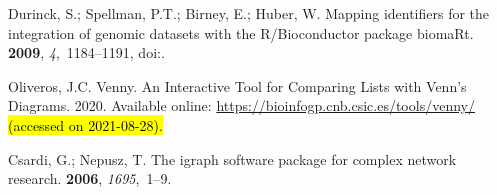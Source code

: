 \documentclass[ijms,article,accept,moreauthors,pdftex]{Definitions/mdpi}
\begin{document}
\begin{thebibliography}{999}
Durinck, S.; Spellman, P.T.; Birney, E.; Huber, W.
\newblock Mapping identifiers for the integration of genomic datasets with the
  R/Bioconductor package {biomaRt}.
 {\bf 2009}, {\em 4},~1184--1191,
\newblock
  doi:{\href{https://doi.org/10.1038/nprot.2009.97}{}}.

Oliveros, J.C.
\newblock Venny. An Interactive Tool for Comparing Lists with Venn's Diagrams.  2020.
\newblock Available online: \url{https://bioinfogp.cnb.csic.es/tools/venny/} \hl{(accessed on 2021-08-28). } %

Csardi, G.; Nepusz, T. 
\newblock The igraph software package for complex network research.
 {\bf 2006}, {\em 1695},~1--9.

\end{thebibliography}

\end{document}
